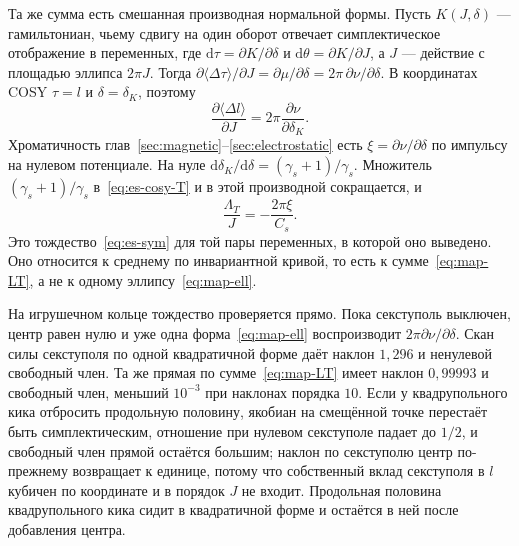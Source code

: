 \documentclass[aps,pra,preprint,a4paper,amsmath,amssymb,longbibliography]{revtex4-2}
\begin{document}
Та же сумма есть смешанная производная нормальной формы. Пусть $K(J,\delta)$ --- гамильтониан, чьему сдвигу на один оборот отвечает симплектическое отображение в переменных, где $\mathrm{d}\tau=\partial K/\partial\delta$ и $\mathrm{d}\theta=\partial K/\partial J$, а $J$ --- действие с площадью эллипса $2\pi J$. Тогда $\partial\langle\Delta\tau\rangle/\partial J=\partial\mu/\partial\delta=2\pi\,\partial\nu/\partial\delta$. В координатах COSY $\tau=l$ и $\delta=\delta_K$, поэтому
\begin{equation}
\label{eq:map-id}
\frac{\partial\langle\Delta l\rangle}{\partial J}
=
2\pi\frac{\partial\nu}{\partial\delta_K}.
\end{equation}
Хроматичность глав~\ref{sec:magnetic}--\ref{sec:electrostatic} есть $\xi=\partial\nu/\partial\delta$ по импульсу на нулевом потенциале. На нуле $\mathrm{d}\delta_K/\mathrm{d}\delta=(\gamma_s+1)/\gamma_s$. Множитель $(\gamma_s+1)/\gamma_s$ в~\eqref{eq:es-cosy-T} и в этой производной сокращается, и
\begin{equation}
\label{eq:map-xi}
\frac{\Lambda_T}{J}
=
-\frac{2\pi\xi}{C_s}.
\end{equation}
Это тождество~\eqref{eq:es-sym} для той пары переменных, в которой оно выведено. Оно относится к среднему по инвариантной кривой, то есть к сумме~\eqref{eq:map-LT}, а не к одному эллипсу~\eqref{eq:map-ell}.

На игрушечном кольце тождество проверяется прямо. Пока секступоль выключен, центр равен нулю и уже одна форма~\eqref{eq:map-ell} воспроизводит $2\pi\partial\nu/\partial\delta$. Скан силы секступоля по одной квадратичной форме даёт наклон $1{,}296$ и ненулевой свободный член. Та же прямая по сумме~\eqref{eq:map-LT} имеет наклон $0{,}99993$ и свободный член, меньший $10^{-3}$ при наклонах порядка $10$. Если у квадрупольного кика отбросить продольную половину, якобиан на смещённой точке перестаёт быть симплектическим, отношение при нулевом секступоле падает до $1/2$, и свободный член прямой остаётся большим; наклон по секступолю центр по-прежнему возвращает к единице, потому что собственный вклад секступоля в $l$ кубичен по координате и в порядок $J$ не входит. Продольная половина квадрупольного кика сидит в квадратичной форме и остаётся в ней после добавления центра.
\end{document}
